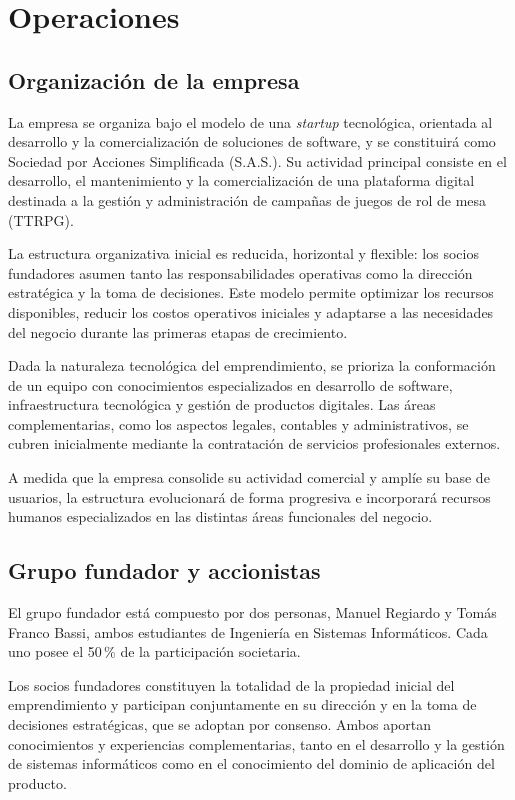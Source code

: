 \capredactadotrue
\section{Operaciones}

\subsection{Organización de la empresa}
La empresa se organiza bajo el modelo de una \textit{startup} tecnológica, orientada al desarrollo y la comercialización de soluciones de software, y se constituirá como Sociedad por Acciones Simplificada (S.A.S.). Su actividad principal consiste en el desarrollo, el mantenimiento y la comercialización de una plataforma digital destinada a la gestión y administración de campañas de juegos de rol de mesa (TTRPG).

La estructura organizativa inicial es reducida, horizontal y flexible: los socios fundadores asumen tanto las responsabilidades operativas como la dirección estratégica y la toma de decisiones. Este modelo permite optimizar los recursos disponibles, reducir los costos operativos iniciales y adaptarse a las necesidades del negocio durante las primeras etapas de crecimiento.

Dada la naturaleza tecnológica del emprendimiento, se prioriza la conformación de un equipo con conocimientos especializados en desarrollo de software, infraestructura tecnológica y gestión de productos digitales. Las áreas complementarias, como los aspectos legales, contables y administrativos, se cubren inicialmente mediante la contratación de servicios profesionales externos.

A medida que la empresa consolide su actividad comercial y amplíe su base de usuarios, la estructura evolucionará de forma progresiva e incorporará recursos humanos especializados en las distintas áreas funcionales del negocio.

\subsection{Grupo fundador y accionistas}
El grupo fundador está compuesto por dos personas, Manuel Regiardo y Tomás Franco Bassi, ambos estudiantes de Ingeniería en Sistemas Informáticos. Cada uno posee el 50\,\% de la participación societaria.

Los socios fundadores constituyen la totalidad de la propiedad inicial del emprendimiento y participan conjuntamente en su dirección y en la toma de decisiones estratégicas, que se adoptan por consenso. Ambos aportan conocimientos y experiencias complementarias, tanto en el desarrollo y la gestión de sistemas informáticos como en el conocimiento del dominio de aplicación del producto.


